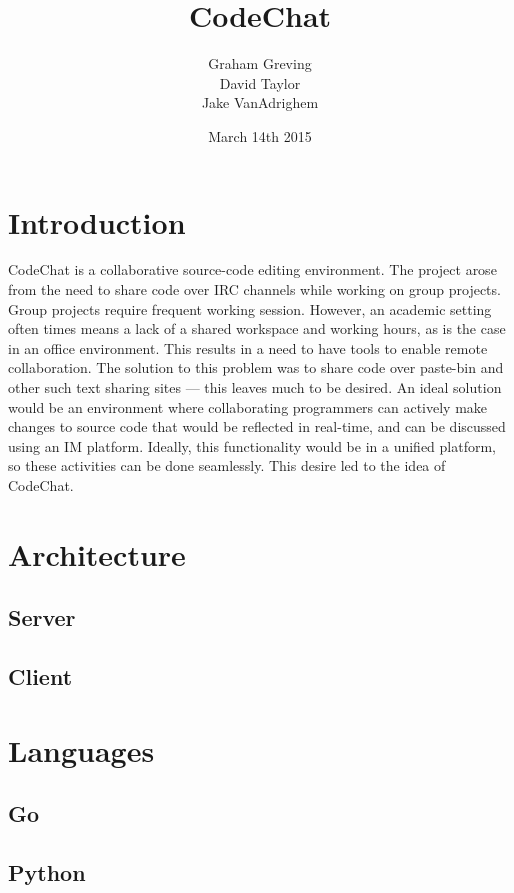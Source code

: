 \documentclass[10pt, letterpaper]{article}
\title{CodeChat}
\author{Graham Greving \\ David Taylor \\ Jake VanAdrighem}
\date{March 14th 2015}
\begin{document}
\maketitle

\section*{Introduction}

CodeChat is a collaborative source-code editing environment. The project
arose from the need to share code over IRC channels while working on group 
projects. Group projects require frequent working session. However, an
academic setting often times means a lack of a shared workspace and
working hours, as is the case in an office environment. This results in
a need to have tools to enable remote collaboration.
The solution to this problem was to share code over paste-bin and other
such text sharing sites --- this leaves much to be desired. An ideal
solution would be an environment where collaborating programmers can
actively make changes to source code that would be reflected in
real-time, and can be discussed using an IM platform. Ideally, this
functionality would be in a unified platform, so these activities
can be done seamlessly. This desire led to the idea of CodeChat.



\section*{Architecture}

\subsection*{Server}

\subsection*{Client}

\section*{Languages}

\subsection*{Go}

\subsection*{Python}
\end{document}
